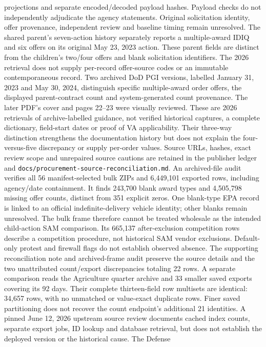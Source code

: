 projections and separate encoded/decoded payload hashes. Payload checks do not
independently adjudicate the agency statements. Original solicitation identity,
offer provenance, independent review and baseline timing remain unresolved.
The shared parent's seven-action history separately reports a multiple-award
IDIQ and six offers on its original May 23, 2023 action. These parent fields
are distinct from the children's two/four offers and blank solicitation
identifiers. The 2026 retrieval does not supply per-record offer-source codes
or an immutable contemporaneous record.
Two archived DoD PGI versions, labelled January 31, 2023 and May 30, 2024,
distinguish specific multiple-award order offers, the displayed parent-contract
count and system-generated count provenance. The later PDF's cover and pages
22--23 were visually reviewed. These are 2026 retrievals of archive-labelled
guidance, not verified historical captures, a complete dictionary, field-start
dates or proof of VA applicability. Their three-way distinction strengthens the
documentation history but does not explain the four-versus-five discrepancy
or supply per-order values. Source URLs, hashes, exact review scope and
unrepaired source cautions are retained in the publisher ledger and
\texttt{docs/procurement-source-reconciliation.md}.
An archived-file audit verifies all 56 manifest-selected bulk ZIPs and
6,449,101 exported rows, including agency/date containment. It finds 243,700
blank award types and 4,505,798 missing offer counts, distinct from 351 explicit
zeros. One blank-type EPA record is linked to an official indefinite-delivery
vehicle identity; other blanks remain unresolved. The bulk frame therefore
cannot be treated wholesale as the intended child-action SAM comparison.
Its 665,137 after-exclusion competition rows describe a competition procedure,
not historical SAM vendor exclusions. Default-only protest and firewall flags
do not establish observed absence. The supporting reconciliation note and
archived-frame audit preserve the source details and the two unattributed
count/export discrepancies totaling 22 rows.
A separate comparison reads the Agriculture quarter archive and 33 smaller
saved exports covering its 92 days. Their complete thirteen-field row
multisets are identical: 34,657 rows, with no unmatched or value-exact duplicate
rows. Finer saved partitioning does not recover the count endpoint's additional
21 identities. A pinned June 12, 2026 upstream source review documents cached
index counts, separate export jobs, ID lookup and database retrieval, but does
not establish the deployed version or the historical cause. The Defense
